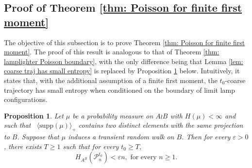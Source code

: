 \documentclass[reqno,oneside,11pt]{amsart}
\newcommand{\supp}[1]{\mathrm{supp}(#1)}
\theoremstyle{plain}
\newtheorem{prop}[thm]{Proposition}
\theoremstyle{definition}
\begin{document}
\subsection{Proof of Theorem \ref{thm: Poisson for finite first moment}}\label{subsection: measures with a finite first moment}
The objective of this subsection is to prove Theorem \ref{thm: Poisson for finite first moment}. The proof of this result is analogous to that of Theorem \ref{thm: lamplighter Poisson boundary}, with the only difference being that Lemma \ref{lem: coarse traj has small entropy} is replaced by Proposition \ref{prop: identification of B with finite first moment} below. Intuitively, it states that, with the additional assumption of a finite first moment, the $t_0$-coarse trajectory has small entropy when conditioned on the boundary of limit lamp configurations.
\begin{prop}\label{prop: identification of B with finite first moment}
Let $\mu$ be a probability measure on $A\wr B$ with $H(\mu)<\infty$ and such that \ $\langle\supp{\mu}\rangle_{+}$ contains two distinct elements with the same projection to $B$. Suppose that $\mu$ induces a transient random walk on $B$. Then for every $\varepsilon >0$, there exists $T\ge 1$ such that for every $t_0\ge T,$
	\begin{equation*}
		H_{A^B}(\mathcal{P}_n^{t_0})<\varepsilon n, \text{ for every } n\ge 1.
	\end{equation*}
\end{prop}
\end{document}
